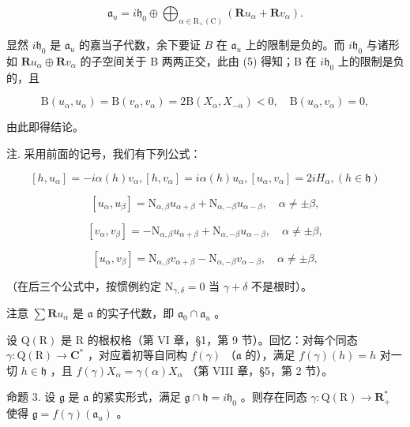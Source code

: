 \[
\mathfrak {a} _ {u} = i \mathfrak {h} _ {0} \oplus \bigoplus_ {\alpha \in \mathrm{R} _ {+} (\mathrm{C})} \left(\mathbf {R} u _ {\alpha} + \mathbf {R} v _ {\alpha}\right).\tag{7}
\]

显然 \(i\mathfrak{h}_0\) 是 \(\mathfrak{a}_u\) 的嘉当子代数，余下要证 \(B\) 在 \(\mathfrak{a}_u\) 上的限制是负的。而 \(i\mathfrak{h}_0\) 与诸形如 \(\mathbf{R}u_{\alpha}\oplus \mathbf{R}v_{\alpha}\) 的子空间关于 B 两两正交，此由 (5) 得知；B 在 \(i\mathfrak{h}_0\) 上的限制是负的，且

\[
\mathrm{B} (u _ {\alpha}, u _ {\alpha}) = \mathrm{B} (v _ {\alpha}, v _ {\alpha}) = 2 \mathrm{B} (X _ {\alpha}, X _ {- \alpha}) <   0, \quad \mathrm{B} (u _ {\alpha}, v _ {\alpha}) = 0,\tag{8}
\]

由此即得结论。

注. 采用前面的记号，我们有下列公式：

\[
[ h, u _ {\alpha} ] = - i \alpha (h) v _ {\alpha}, [ h, v _ {\alpha} ] = i \alpha (h) u _ {\alpha}, [ u _ {\alpha}, v _ {\alpha} ] = 2 i H _ {\alpha}, (h \in \mathfrak {h})\tag{9}
\]

\[
[ u _ {\alpha}, u _ {\beta} ] = \mathrm{N} _ {\alpha , \beta} u _ {\alpha + \beta} + \mathrm{N} _ {\alpha , - \beta} u _ {\alpha - \beta}, \quad \alpha \neq \pm \beta ,\tag{10}
\]

\[
[ v _ {\alpha}, v _ {\beta} ] = - \mathrm{N} _ {\alpha , \beta} u _ {\alpha + \beta} + \mathrm{N} _ {\alpha , - \beta} u _ {\alpha - \beta}, \quad \alpha \neq \pm \beta ,\tag{11}
\]

\[
[ u _ {\alpha}, v _ {\beta} ] = \mathrm{N} _ {\alpha , \beta} v _ {\alpha + \beta} - \mathrm{N} _ {\alpha , - \beta} v _ {\alpha - \beta}, \quad \alpha \neq \pm \beta ,\tag{12}
\]

（在后三个公式中，按惯例约定 \(\mathrm{N}_{\gamma, \delta} = 0\) 当 \(\gamma + \delta\) 不是根时）。

注意 \(\sum \mathbf{R}u_{\alpha}\) 是 \(\mathfrak{a}\) 的实子代数，即 \(\mathfrak{a}_0 \cap \mathfrak{a}_u\) 。

设 \(\mathrm{Q}(\mathrm{R})\) 是 R 的根权格（第 VI 章，§1，第 9 节）。回忆：对每个同态 \(\gamma : \mathrm{Q}(\mathrm{R}) \to \mathbf{C}^*\) ，对应着初等自同构 \(f(\gamma)\) （\(\mathfrak{a}\) 的），满足 \(f(\gamma)(h) = h\) 对一切 \(h \in \mathfrak{h}\) ，且 \(f(\gamma)X_{\alpha} = \gamma(\alpha)X_{\alpha}\) （第 VIII 章，§5，第 2 节）。

命题 3. 设 \(\mathfrak{g}\) 是 \(\mathfrak{a}\) 的紧实形式，满足 \(\mathfrak{g} \cap \mathfrak{h} = i\mathfrak{h}_0\) 。则存在同态 \(\gamma: \mathrm{Q}(\mathrm{R}) \to \mathbf{R}_{+}^{*}\) 使得 \(\mathfrak{g} = f(\gamma)(\mathfrak{a}_u)\) 。

